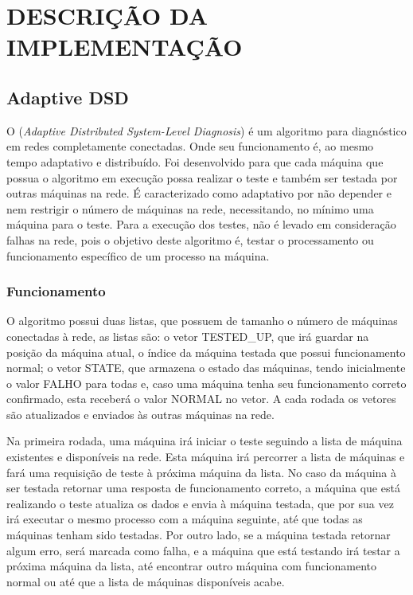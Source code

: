 
\chapter{DESCRIÇÃO DA IMPLEMENTAÇÃO}
\label{chap:descricao_da_implementacao}

\section{Adaptive DSD}
\label{sec:adaptiveDSD}

O \adaptive (\textit{Adaptive Distributed System-Level Diagnosis}) é um algoritmo para diagnóstico em redes completamente conectadas. Onde seu funcionamento é, ao mesmo tempo 
adaptativo e distribuído. Foi desenvolvido para que cada máquina que possua o algoritmo em execução possa realizar o teste e também ser testada por outras máquinas na rede.
É caracterizado como adaptativo por não depender e nem restrigir o número de máquinas na rede, necessitando, no mínimo uma máquina para o teste. Para a execução dos testes, não é levado
em consideração falhas na rede, pois o objetivo deste algoritmo é, testar o processamento ou funcionamento específico de um processo na máquina.

\subsection{Funcionamento}
\label{sub:adaptiveDSD_Funcionamento}
O algoritmo possui duas listas, que possuem de tamanho o número de máquinas conectadas à rede, as listas são: o vetor TESTED\_UP, que irá guardar na posição da máquina atual, 
o índice da máquina testada que possui funcionamento normal; o vetor STATE, que armazena o estado das máquinas, tendo inicialmente o valor FALHO para todas e, caso uma máquina tenha seu 
funcionamento correto confirmado, esta receberá o valor NORMAL no vetor. A cada rodada os vetores são atualizados e enviados às outras máquinas na rede.

Na primeira rodada, uma máquina irá iniciar o teste seguindo a lista de máquina existentes e disponíveis na rede. Esta máquina irá percorrer a
lista de máquinas e fará uma requisição de teste à próxima máquina da lista. No caso da máquina à ser testada retornar uma resposta de funcionamento correto, a máquina que está realizando o 
teste atualiza os dados e envia à máquina testada, que por sua vez irá executar o mesmo processo com a máquina seguinte, até que todas as máquinas tenham sido testadas. Por outro lado, se 
a máquina testada retornar algum erro, será marcada como falha, e a máquina que está testando irá testar a próxima máquina da lista, até encontrar outro máquina com funcionamento normal 
ou até que a lista de máquinas disponíveis acabe.

